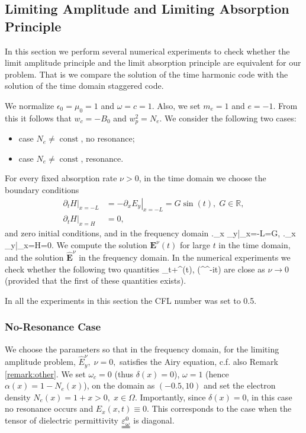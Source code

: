 \subsection{Limiting Amplitude and Limiting Absorption Principle}
In this section we perform several numerical experiments to check whether the limit amplitude
principle and the limit
absorption principle are equivalent for our problem.
That is we compare the solution of the time harmonic code with the solution of the time domain staggered code.

We normalize  $\epsilon_0=\mu_0=1$ and $\omega=c=1$. 
Also, we set $m_e=1$ and $e=-1$. From this it follows that $w_c=-B_0$ and $w_p^2=N_e$. 
We consider the following two cases:
\begin{itemize}
 \item case $N_e\neq \operatorname{const}$, no resonance;
 \item case $N_e\neq \operatorname{const}$, resonance.
\end{itemize}
For every fixed absorption rate $\nu>0$, in the time domain we choose the boundary conditions
\begin{align}
\label{eq:bcs}
\left.\partial_t H\right|_{x=-L}&=-\left.\partial_x E_y\right|_{x=-L}=G\sin(t),\; G\in \mathbb{R}, \\
 \nonumber
 \left.\partial_t H\right|_{x=H}&=0,
\end{align}
and zero initial conditions, and in the frequency domain
\bealn
 \left.\partial_x _y\right|_{x=-L}=G,\; \left.\partial_x _y\right|_{x=H}=0.
\eealn
We compute the solution $\mathbf{E}^{\nu}(t)$ for large $t$ in the time domain, and the solution $\hat{\mathbf{E}}^{\nu}$ in the frequency domain. 
In the numerical experiments we check whether the following two quantities
\ben
\lim_{t\rightarrow+\infty}^{\nu}(t),  \Im\left(^{\nu}^{-it}\right)
\een
are close as $\nu\rightarrow 0$ (provided that the first of these quantities exists). 

In all the experiments in this section the CFL number was set to 0.5.
\subsubsection{No-Resonance Case}
\label{section:absorption_airy}
We choose the parameters so that in the frequency domain, for the limiting amplitude problem, $\hat{E}_{y}^{\nu},\; \nu=0,$ satisfies 
the Airy equation, c.f. also Remark \ref{remark:other}. We set $\omega_c=0$ (thus $\delta(x)=0$), $\omega=1$ (hence $\alpha(x)=1-N_e(x)$), 
on the domain as $(-0.5, 10)$ and set the electron density $N_e(x)=1+x>0,\; x\in \Omega$. 
Importantly, since $\delta(x)=0$, in this case no resonance occurs and $E_{x}(x,t)\equiv 0$. This corresponds to the case when the
tensor of dielectric permittivity $\uuline{\varepsilon^{0}_{\omega}}$ is 
diagonal. 

